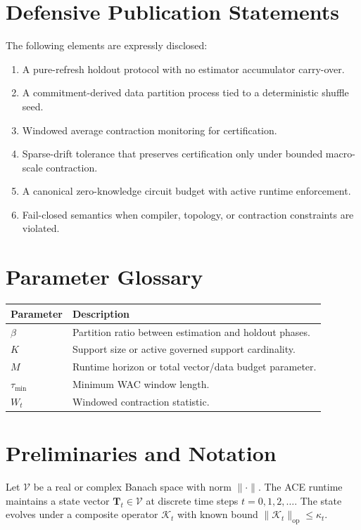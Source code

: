 \documentclass[11pt]{article}
\begin{document}
\section{Defensive Publication Statements}
The following elements are expressly disclosed:
\begin{enumerate}
    \item A pure-refresh holdout protocol with no estimator accumulator carry-over.
    \item A commitment-derived data partition process tied to a deterministic shuffle seed.
    \item Windowed average contraction monitoring for certification.
    \item Sparse-drift tolerance that preserves certification only under bounded macro-scale contraction.
    \item A canonical zero-knowledge circuit budget with active runtime enforcement.
    \item Fail-closed semantics when compiler, topology, or contraction constraints are violated.
\end{enumerate}

\appendix

\section{Parameter Glossary}
\begin{longtable}{p{} p{}}
\toprule
Parameter & Description \\
\midrule
\(\beta\) & Partition ratio between estimation and holdout phases. \\
\(K\) & Support size or active governed support cardinality. \\
\(M\) & Runtime horizon or total vector/data budget parameter. \\
\(\tau_{\min}\) & Minimum WAC window length. \\
\(W_t\) & Windowed contraction statistic. \\
\bottomrule
\end{longtable}

\section{Preliminaries and Notation}

\begin{definition}
Let $\mathcal{V}$ be a real or complex Banach space with norm $\|\cdot\|$. The ACE runtime maintains a state vector $\mathbf{T}_t \in \mathcal{V}$ at discrete time steps $t = 0, 1, 2, \ldots$. The state evolves under a composite operator $\mathcal{K}_t$ with known bound $\|\mathcal{K}_t\|_{\mathrm{op}} \leq \kappa_t$.
\end{definition}
\end{document}
